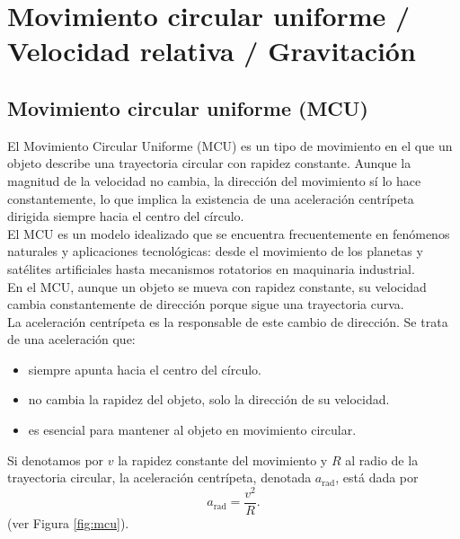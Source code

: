 \setcounter{page}{68}
\setcounter{chapter}{7}

\chapter{Movimiento circular uniforme / Velocidad relativa / Gravitaci\'on}
\label{cap:cap7}
\vspace{-14ex}

\raggedright
\section{Movimiento circular uniforme (MCU)}

El Movimiento Circular Uniforme (MCU) es un tipo de movimiento en el que un objeto describe una trayectoria circular con rapidez constante. Aunque la magnitud de la velocidad no cambia, la dirección del movimiento sí lo hace constantemente, lo que implica la existencia de una aceleración centrípeta dirigida siempre hacia el centro del círculo. \\[.35cm]

El MCU es un modelo idealizado que se encuentra frecuentemente en fenómenos naturales y aplicaciones tecnológicas: desde el movimiento de los planetas y satélites artificiales hasta mecanismos rotatorios en maquinaria industrial. \\[.35cm]

En el MCU, aunque un objeto se mueva con rapidez constante, su velocidad cambia constantemente de dirección porque sigue una trayectoria curva.\\[.35cm]

La aceleración centrípeta es la responsable de este cambio de dirección. Se trata de una aceleración que:

\begin{itemize}
    \item siempre apunta hacia el centro del círculo.
  
    \item no cambia la rapidez del objeto, solo la dirección de su velocidad.
   
    \item es esencial para mantener al objeto en movimiento circular.
\end{itemize}

Si denotamos por $v$ la rapidez constante del movimiento y $R$ al radio de la trayectoria circular, la aceleraci\'on centr\'ipeta, denotada $a_\text{rad}$, est\'a dada por
\begin{equation}
a_{\text{rad}}=\frac{v^{2}}{R}.\end{equation}
 (ver Figura \ref{fig:mcu}). \\[.35cm]

